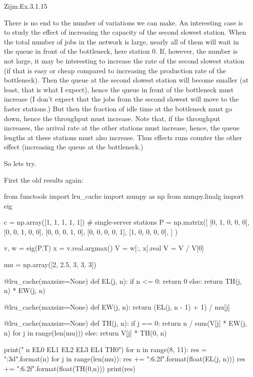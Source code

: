 \begin{exercise}
Zijm.Ex.3.1.15
\begin{solution}
 There is no end to the number of variations we can make. An
 interesting case is to study the effect of increasing the capacity
 of the second slowest station. When the total number of jobs in the
 network is large, nearly all of them will wait in the queue in front
 of the bottleneck, here station 0. If, however, the number is not
 large, it may be interesting to increase the rate of the second
 slowest station (if that is easy or cheap compared to increasing the
 production rate of the bottleneck). Then the queue at the second
 slowest station will become smaller (at least, that is what I
 expect), hence the queue in front of the bottleneck must increase (I
 don't expect that the jobs from the second slowest will move to the
 faster stations.) But then the fraction of idle time at the
 bottleneck must go down, hence the throughput must increase. Note
 that, if the throughput increases, the arrival rate at the other
 stations must increase, hence, the queue lengths at these stations
 must also increase. Thus effects runs counter the other effect
 (increasing the queue at the bottleneck.)

 So lets try.

First the old results again:

\begin{pyconsole}
from functools import lru_cache
import numpy as np
from numpy.linalg import eig


c = np.array([1, 1, 1, 1, 1]) # single-server stations
P = np.matrix([
 [0, 1, 0, 0, 0],
 [0, 0, 1, 0, 0],
 [0, 0, 0, 1, 0],
 [0, 0, 0, 0, 1],
 [1, 0, 0, 0, 0],
]
)

v, w = eig(P.T)
x = v.real.argmax()
V = w[:, x].real
V = V / V[0]

mu = np.array([2, 2.5, 3, 3, 3])

@lru_cache(maxsize=None)
def EL(j, n):
 if n <= 0:
 return 0
 else:
 return TH(j, n) * EW(j, n)

@lru_cache(maxsize=None)
def EW(j, n):
 return (EL(j, n - 1) + 1) / mu[j]


@lru_cache(maxsize=None)
def TH(j, n):
 if j == 0:
 return n / sum(V[j] * EW(j, n) for j in range(len(mu)))
 else:
 return V[j] * TH(0, n)

print(" n EL0 EL1 EL2 EL3 EL4 TH0")
for n in range(8, 11):
 res = "{:3d}".format(n)
 for j in range(len(mu)):
 res += "{:6.2f}".format(float(EL(j, n)))
 res += "{:6.2f}".format(float(TH(0,n)))
 print(res)
 

\end{pyconsole}
\end{solution}
\end{exercise}
